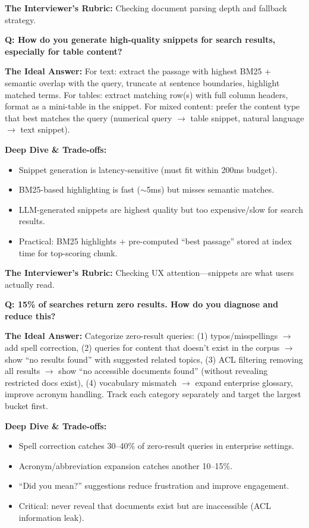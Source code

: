 \textbf{The Interviewer's Rubric:} Checking document parsing depth and fallback strategy.

\textbf{Q: How do you generate high-quality snippets for search results, especially for table content?}

\textbf{The Ideal Answer:} For text: extract the passage with highest BM25 + semantic overlap with the query, truncate at sentence boundaries, highlight matched terms. For tables: extract matching row(s) with full column headers, format as a mini-table in the snippet. For mixed content: prefer the content type that best matches the query (numerical query $\rightarrow$ table snippet, natural language $\rightarrow$ text snippet).

\textbf{Deep Dive \& Trade-offs:}
\begin{itemize}
  \item Snippet generation is latency-sensitive (must fit within 200ms budget).
  \item BM25-based highlighting is fast ($\sim$5ms) but misses semantic matches.
  \item LLM-generated snippets are highest quality but too expensive/slow for search results.
  \item Practical: BM25 highlights + pre-computed ``best passage'' stored at index time for top-scoring chunk.
\end{itemize}

\textbf{The Interviewer's Rubric:} Checking UX attention---snippets are what users actually read.

\textbf{Q: 15\% of searches return zero results. How do you diagnose and reduce this?}

\textbf{The Ideal Answer:} Categorize zero-result queries: (1) typos/misspellings $\rightarrow$ add spell correction, (2) queries for content that doesn't exist in the corpus $\rightarrow$ show ``no results found'' with suggested related topics, (3) ACL filtering removing all results $\rightarrow$ show ``no accessible documents found'' (without revealing restricted docs exist), (4) vocabulary mismatch $\rightarrow$ expand enterprise glossary, improve acronym handling. Track each category separately and target the largest bucket first.

\textbf{Deep Dive \& Trade-offs:}
\begin{itemize}
  \item Spell correction catches 30--40\% of zero-result queries in enterprise settings.
  \item Acronym/abbreviation expansion catches another 10--15\%.
  \item ``Did you mean?'' suggestions reduce frustration and improve engagement.
  \item Critical: never reveal that documents exist but are inaccessible (ACL information leak).
\end{itemize}

